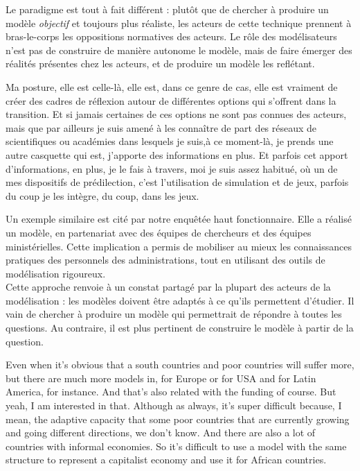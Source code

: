 Le paradigme est tout à fait différent : plutôt que de chercher à produire un modèle \textit{objectif} et toujours plus réaliste, les acteurs de cette technique prennent à bras-le-corps les oppositions normatives des acteurs. Le rôle des modélisateurs n'est pas de construire de manière autonome le modèle, mais de faire émerger des réalités présentes chez les acteurs, et de produire un modèle les reflétant. 

\begin{authoredquote}
    Ma posture, elle est celle-là, elle est, dans ce genre de cas, elle est vraiment de créer des cadres de réflexion autour de différentes options qui s'offrent dans la transition. Et si jamais certaines de ces options ne sont pas connues des acteurs, mais que par ailleurs je suis amené à les connaître de part des réseaux de scientifiques ou académies dans lesquels je suis,à ce moment-là, je prends une autre casquette qui est, j'apporte des informations en plus. Et parfois cet apport d'informations, en plus, je le fais à travers, moi je suis assez habitué, où un de mes dispositifs de prédilection, c'est l'utilisation de simulation et de jeux, parfois du coup je les intègre, du coup, dans les jeux.
\end{authoredquote}

Un exemple similaire est cité par notre enquêtée haut fonctionnaire. Elle a réalisé un modèle, en partenariat avec des équipes de chercheurs et des équipes ministérielles. Cette implication a permis de mobiliser au mieux les connaissances pratiques des personnels des administrations, tout en utilisant des outils de modélisation rigoureux. \\


Cette approche renvoie à un constat partagé par la plupart des acteurs de la modélisation : les modèles doivent être adaptés à ce qu'ils permettent d'étudier. Il vain de chercher à produire un modèle qui permettrait de répondre à toutes les questions. Au contraire, il est plus pertinent de construire le modèle à partir de la question. 

\begin{authoredquote}
    Even when it's obvious that  a south countries and poor countries will suffer more, but there are much more models in, for Europe or for USA and for Latin America, for instance. And that's also related with the  funding of course. But yeah, I am interested in that. Although as always, it's super difficult  because, I mean, the adaptive capacity that some poor countries that are currently growing and going different directions, we don't know. And there are also a lot of countries with informal economies. So it's difficult to use a model with the same structure to represent  a capitalist economy and use it for African countries.
\end{authoredquote}


